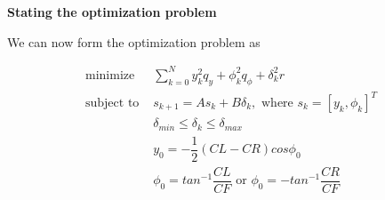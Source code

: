 \textbf{Stating the optimization problem}

We can now form the optimization problem as

\begin{align}
  \text{minimize }    & \sum\limits_{k=0}^N y_k^2 q_y + \phi_k^2 q_{\phi} + \delta_k^2 r \\
  \text{subject to }  & s_{k+1} = A s_k + B \delta_k,\text{ where } s_k = [y_k, \phi_k]^T \\
                      & \delta_{min} \leq \delta_k \leq \delta_{max} \\
                      & y_0 = -\dfrac{1}{2}(CL-CR)cos\phi_0 \\
                      & \phi_0 = tan^{-1}\dfrac{CL}{CF} \text{ or } \phi_0 = -tan^{-1}\dfrac{CR}{CF}
\end{align}
